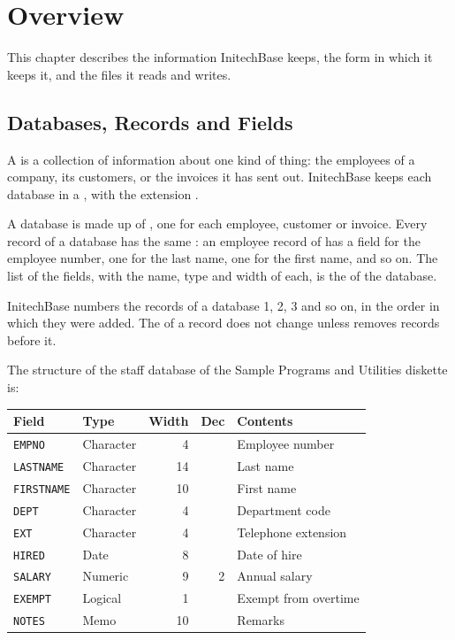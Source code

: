 \chapter{Overview}
This chapter describes the information InitechBase keeps, the form in which it
keeps it, and the files it reads and writes.

\section{Databases, Records and Fields}
A  is a collection of information about one kind of thing:
the employees of a company, its customers, or the invoices it has sent out.
InitechBase keeps each database in a , with the extension
.

A database is made up of , one for each employee, customer or
invoice.  Every record of a database has the same : an employee
record of  has a field for the employee number, one for the
last name, one for the first name, and so on.  The list of the fields, with
the name, type and width of each, is the  of the database.

InitechBase numbers the records of a database 1, 2, 3 and so on, in the order
in which they were added.  The  of a record does not
change unless  removes records before it.

The structure of the staff database of the Sample Programs and Utilities
diskette is:

\noindent\begin{tabular}{@{}llrrl@{}}
\hline
\textsf{\textbf{Field}} & \textsf{\textbf{Type}} & \textsf{\textbf{Width}} &
  \textsf{\textbf{Dec}} & \textsf{\textbf{Contents}}\\
\hline
\texttt{EMPNO} & Character & 4 & & Employee number\\
\texttt{LASTNAME} & Character & 14 & & Last name\\
\texttt{FIRSTNAME} & Character & 10 & & First name\\
\texttt{DEPT} & Character & 4 & & Department code\\
\texttt{EXT} & Character & 4 & & Telephone extension\\
\texttt{HIRED} & Date & 8 & & Date of hire\\
\texttt{SALARY} & Numeric & 9 & 2 & Annual salary\\
\texttt{EXEMPT} & Logical & 1 & & Exempt from overtime\\
\texttt{NOTES} & Memo & 10 & & Remarks\\
\hline
\end{tabular}

